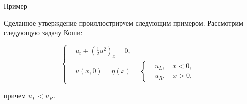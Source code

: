 \documentclass[10pt,xcolor=pst,aspectratio=169]{beamer}
\begin{document}
\begin{frame}{Пример}

    \transdissolve[duration=0.1]
    \justifying
    \large

    Сделанное утверждение проиллюстрируем следующим примером. Рассмотрим следующую задачу Коши:

    \[
        \begin{cases}
            &u_{t} + \left( \frac{1}{2} u^{2} \right)_{x} = 0, \\
            &u(x, 0) = \eta(x) =
            \begin{cases}
                &u_{L}, \quad x < 0, \\
                &u_{R}, \quad x > 0,
            \end{cases}
        \end{cases}
    \]

    причем $u_{L} < u_{R}$.

\end{frame}
\end{document}
